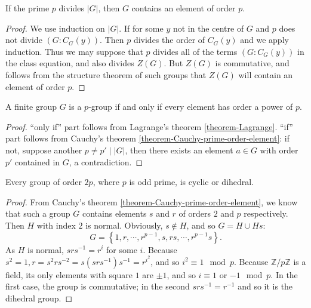 \begin{theorem}[Cauchy]
  \label{theorem-Cauchy-prime-order-element}
  If the prime \( p \) divides \( \left\vert G \right\vert \), then \( G \) contains an element of order \( p \).
\end{theorem}
\begin{proof}
  We use induction on \( \left\vert G \right\vert \).
  If for some \( y \) not in the centre of \( G \) and \( p \) does not divide \( (G: C_G(y)) \).
  Then \( p \) divides the order of \( C_G(y) \) and we apply induction.
  Thus we may suppose that \( p \) divides all of the terms \( (G: C_G(y)) \) in the class equation, and also divides \( Z(G) \).
  But \( Z(G) \) is commutative, and follows from the structure theorem of such groups that \( Z(G) \) will contain an element of order \( p \).
\end{proof}

\begin{corollary}
  \label{corollary-p-group-iff-condition}
  A finite group \( G \) is a \( p \)-group if and only if every element has order a power of \( p \).
\end{corollary}
\begin{proof}
  ``only if'' part follows from Lagrange's theorem \ref{theorem-Lagrange}.
  ``if'' part follows from Cauchy's theorem \ref{theorem-Cauchy-prime-order-element}: if not, suppose another \( p \neq p' \mid \left\vert G \right\vert \), then there exists an element \( a \in G \) with order \( p' \) contained in \( G \), a contradiction.
\end{proof}

\begin{corollary}
  \label{corollary-group-structure-with-order-2p}
  Every group of order \( 2p \), where \( p \) is odd prime, is cyclic or dihedral.
\end{corollary}
\begin{proof}
  From Cauchy's theorem \ref{theorem-Cauchy-prime-order-element}, we know that such a group \( G \) contains elements \( s \) and \( r \) of orders \( 2 \) and \( p \) respectively.
  Then \( H \) with index \( 2 \) is normal.
  Obviously, \( s \notin H \), and so \( G = H \cup Hs \):
  \[
    G = \left\lbrace 1, r, \cdots, r^{p - 1}, s, rs, \cdots, r^{p - 1}s \right\rbrace.
  \]
  As \( H \) is normal, \( srs^{-1} = r^i \) for some \( i \).
  Because \( s^2 = 1, r= s^2 r s^{-2} = s(srs^{-1})s^{-1} = r^{i^2} \), and so \( i^2 \equiv 1 \mod{p} \).
  Because \( \mathbb{Z} / p \mathbb{Z} \) is a field, its only elements with square \( 1 \) are \( \pm 1 \), and so \( i \equiv 1 \) or \( -1 \mod{p} \).
  In the first case, the group is commutative; in the second \( s r s^{-1} = r^{-1} \) and so it is the dihedral group.
\end{proof}



